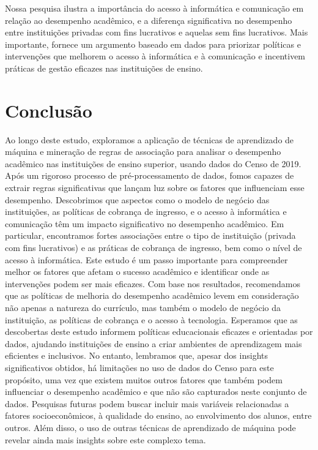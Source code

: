 \documentclass[conference]{IEEEtran}
\begin{document}
Nossa pesquisa ilustra a importância do acesso à informática e comunicação em relação ao desempenho acadêmico, e a diferença significativa no desempenho entre instituições privadas com fins lucrativos e aquelas sem fins lucrativos. Mais importante, fornece um argumento baseado em dados para priorizar políticas e intervenções que melhorem o acesso à informática e à comunicação e incentivem práticas de gestão eficazes nas instituições de ensino.

\section{Conclusão}
Ao longo deste estudo, exploramos a aplicação de técnicas de aprendizado de máquina e mineração de regras de associação para analisar o desempenho acadêmico nas instituições de ensino superior, usando dados do Censo de 2019. Após um rigoroso processo de pré-processamento de dados, fomos capazes de extrair regras significativas que lançam luz sobre os fatores que influenciam esse desempenho.
Descobrimos que aspectos como o modelo de negócio das instituições, as políticas de cobrança de ingresso, e o acesso à informática e comunicação têm um impacto significativo no desempenho acadêmico. Em particular, encontramos fortes associações entre o tipo de instituição (privada com fins lucrativos) e as práticas de cobrança de ingresso, bem como o nível de acesso à informática.
Este estudo é um passo importante para compreender melhor os fatores que afetam o sucesso acadêmico e identificar onde as intervenções podem ser mais eficazes. Com base nos resultados, recomendamos que as políticas de melhoria do desempenho acadêmico levem em consideração não apenas a natureza do currículo, mas também o modelo de negócio da instituição, as políticas de cobrança e o acesso à tecnologia.
Esperamos que as descobertas deste estudo informem políticas educacionais eficazes e orientadas por dados, ajudando instituições de ensino a criar ambientes de aprendizagem mais eficientes e inclusivos. No entanto, lembramos que, apesar dos insights significativos obtidos, há limitações no uso de dados do Censo para este propósito, uma vez que existem muitos outros fatores que também podem influenciar o desempenho acadêmico e que não são capturados neste conjunto de dados.
Pesquisas futuras podem buscar incluir mais variáveis relacionadas a fatores socioeconômicos, à qualidade do ensino, ao envolvimento dos alunos, entre outros. Além disso, o uso de outras técnicas de aprendizado de máquina pode revelar ainda mais insights sobre este complexo tema.
\end{document}
